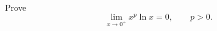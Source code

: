 \begin{exercise}
  \label{ex:hw06:logarithmic-boundary-limit}
  Prove
  \[
    \lim_{x\to0^+}x^p\ln x=0,\qquad p>0.
  \]
\end{exercise}
